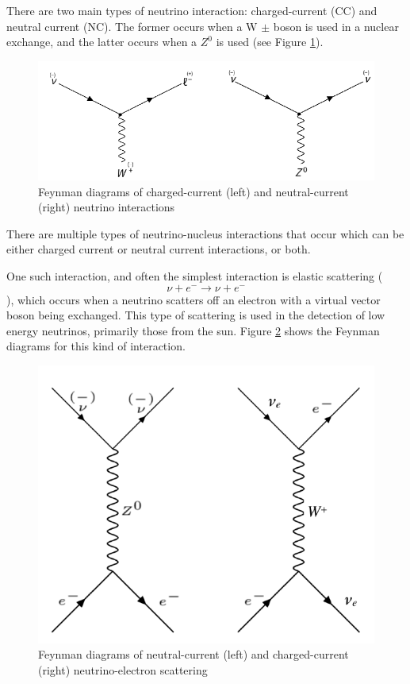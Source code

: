 There are two main types of neutrino interaction: charged-current (CC) and neutral current (NC). The former occurs when a W $\pm$ boson is used in a nuclear exchange, and the latter occurs when a $Z^{0}$ is used (see Figure \ref{fig:CC_NC}).

\begin{figure}
    \includegraphics[width=\textwidth]{Figures/CC_NC.png}
    \caption{Feynman diagrams of charged-current (left) and neutral-current (right) neutrino interactions}
    \label{fig:CC_NC}
\end{figure}

There are multiple types of neutrino-nucleus interactions that occur which can be either charged current or neutral current interactions, or both. 

One such interaction, and often the simplest interaction is elastic scattering ($$
\nu+e^{-} \rightarrow \nu+e^{-}
$$), which occurs when a neutrino scatters off an electron with a virtual vector boson being exchanged. This type of scattering is used in the detection of low energy neutrinos, primarily those from the sun. Figure \ref{fig:elastic_scattering} shows the Feynman diagrams for this kind of interaction.

\begin{figure}
    \includegraphics[width=\textwidth]{Figures/elastic_scattering.png}
    \caption{Feynman diagrams of neutral-current (left) and charged-current (right) neutrino-electron scattering}
    \label{fig:elastic_scattering}
\end{figure}

